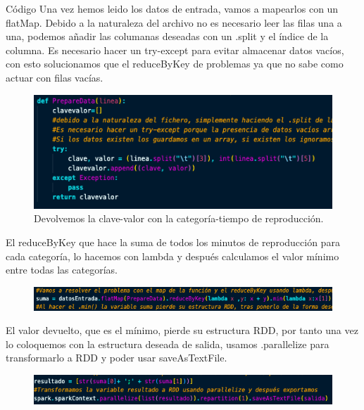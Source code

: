 \documentclass[a4paper]{article}
\begin{document}
\begin{section}{Código}
Una vez hemos leido los datos de entrada, vamos a mapearlos con un flatMap. Debido a la naturaleza del archivo no es necesario leer las filas una a una, podemos añadir las columanas deseadas con un .split y el índice de la columna.
Es necesario hacer un try-except para evitar almacenar datos vacíos, con esto solucionamos que el reduceByKey de problemas ya que no sabe como actuar con filas vacías. 

\begin{figure}[h]
    \centering
    \includegraphics[width=\textwidth, keepaspectratio]{codigo1}
    \caption{Devolvemos la clave-valor con la categoría-tiempo de reproducción.}
\end{figure}

El reduceByKey que hace la suma de todos los minutos de reproducción para cada categoría, lo hacemos con lambda y después calculamos el valor mínimo entre todas las categorías.
\begin{figure}[h]
    \centering
    \includegraphics[width=\textwidth, keepaspectratio]{codigo2}
  
\end{figure}

El valor devuelto, que es el mínimo, pierde su estructura RDD, por tanto una vez lo coloquemos con la estructura deseada de salida, usamos .parallelize para transformarlo a RDD y poder usar saveAsTextFile.
\begin{figure}[h]
    \centering
    \includegraphics[width=\textwidth, keepaspectratio]{codigo3.png}
\end{figure}

\end{section}
\end{document}
